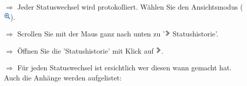 \documentclass{article}
\begin{document}
\begin{multicols}{2}
\begin{tcolorbox}[colback=blue!5,colframe=blue!40!black,title=Statushistorie]
\begin{itemize}
  \item[$\Longrightarrow$] Jeder Statuswechsel wird protokolliert. Wählen Sie den Ansichtsmodus (\includegraphics[height=10pt]{Icons/Lupe.png}).
  \item[$\Longrightarrow$] Scrollen Sie mit der Maus ganz nach unten zu '\includegraphics[height=10pt]{Icons/Pfeil_rechts_g.png} Statushistorie'.
  \item[$\Longrightarrow$] Öffnen Sie die 'Statushistorie' mit Klick auf \includegraphics[height=10pt]{Icons/Pfeil_rechts_g.png}.
  \item[$\Longrightarrow$] Für jeden Statuswechsel ist ersichtlich wer diesen wann gemacht hat. Auch die Anhänge werden aufgelistet:
\end{itemize}

\begin{centering}
\end{centering}

\end{tcolorbox}


\end{multicols}



\vspace{\baselineskip}


\vspace{\baselineskip}
\end{document}
